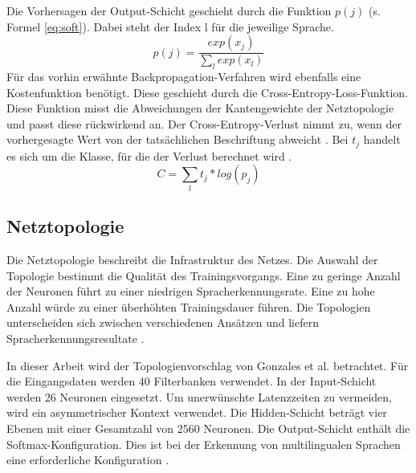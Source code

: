  Die Vorhersagen der Output-Schicht geschieht durch die Funktion $p(j)$  (s. Formel \ref{eq:soft}). Dabei steht der Index l für die jeweilige Sprache.
\begin{equation}
p(j)= \frac{ exp(x_{j}) }{\sum_{l}{}{ exp(x_{l})} }
\label{eq:soft}
\end{equation}
Für das vorhin erwähnte Backpropagation-Verfahren wird ebenfalls eine Kostenfunktion benötigt. Diese geschieht durch die Cross-Entropy-Loss-Funktion. Diese Funktion misst die Abweichungen der Kantengewichte der Netztopologie und passt diese rückwirkend an. Der Cross-Entropy-Verlust nimmt zu, wenn der vorhergesagte Wert von der tatsächlichen Beschriftung abweicht \cite{MLCheatsheet.2017}. Bei $t_{j}$ handelt es sich um die Klasse, für die der Verlust berechnet wird \cite{GonzalezDominguez.2015}.
\begin{equation}
C= \sum_{l}{}{ t_{j} * log(p_{j})} 
\label{eq:back}
\end{equation}

\subsection{Netztopologie}
Die Netztopologie beschreibt die Infrastruktur des Netzes. Die Auswahl der Topologie bestimmt die Qualität des Trainingsvorgangs. Eine zu geringe Anzahl der Neuronen führt zu einer niedrigen Spracherkennungsrate. Eine zu hohe Anzahl würde zu einer überhöhten Trainingsdauer führen. Die Topologien unterscheiden sich zwischen verschiedenen Ansätzen und liefern Spracherkennungsresultate \cite{bishop.2006}. 

In dieser Arbeit wird der Topologienvorschlag von Gonzales et al. betrachtet. Für die Eingangsdaten werden 40 Filterbanken verwendet. In der Input-Schicht werden 26 Neuronen eingesetzt. Um unerwünschte Latenzzeiten zu vermeiden, wird ein asymmetrischer Kontext verwendet. Die Hidden-Schicht beträgt vier Ebenen mit einer Gesamtzahl von 2560 Neuronen. Die Output-Schicht enthält die Softmax-Konfiguration. Dies ist bei der Erkennung von multilingualen Sprachen eine erforderliche Konfiguration \cite{GonzalezDominguez.2015}.
 
